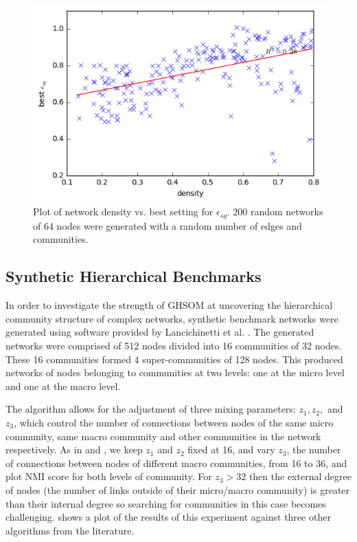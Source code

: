 \documentclass{article}
\begin{document}
\begin{figure}
\includegraphics[scale=0.65]{derived_results.png}
\caption{Plot of network density vs. best setting for $\epsilon_{sg}$. 200 random networks of 64 nodes were generated with a random number of edges and communities.}
\end{figure}

\subsection{Synthetic Hierarchical Benchmarks}
In order to investigate the strength of GHSOM at uncovering the hierarchical community structure of complex networks, synthetic benchmark networks were generated using software provided by Lancichinetti et al. \cite{lancichinetti2009detecting}. 
The generated networks were comprised of 512 nodes divided into 16 communities of 32 nodes. 
These 16 communities formed 4 super-communities of 128 nodes. 
This produced networks of nodes belonging to communities at two levels: one at the micro level and one at the macro level.

The algorithm allows for the adjustment of three mixing parameters: $z_1, z_2,$ and $z_3$, which control the number of connections between nodes of the same micro community, same macro community and other communities in the network respectively. 
As in \cite{lancichinetti2009detecting} and \cite{yang2013hierarchical}, we keep $z_1$ and $z_2$ fixed at 16, and vary $z_3$, the number of connections between nodes of different macro communities, from 16 to 36, and plot NMI score for both levels of community. 
For $z_3 > 32$ then the external degree of nodes (the number of links outside of their micro/macro community) is greater than their internal degree so searching for communities in this case becomes challenging. 
 shows a plot of the results of this experiment against three other algorithms from the literature. 
\end{document}
